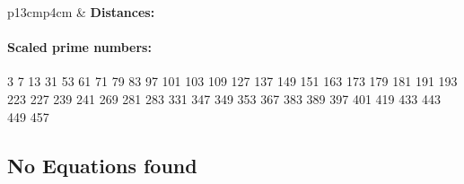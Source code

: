 \documentclass[a4paper,twoside,10pt]{report}
\begin{document}
\begin{longtable}{p{13cm}p{4cm}}
& \textbf{Distances:}\newline
{}\end{longtable}
\paragraph*{Scaled prime numbers:}3 7 13 31 53 61 71 79 83 97 101 103 109 127 137 149 151 163 173 179 181 191 193 223 227 239 241 269 281 283 331 347 349 353 367 383 389 397 401 419 433 443 449 457 \subsection*{No Equations found}
\end{document}
